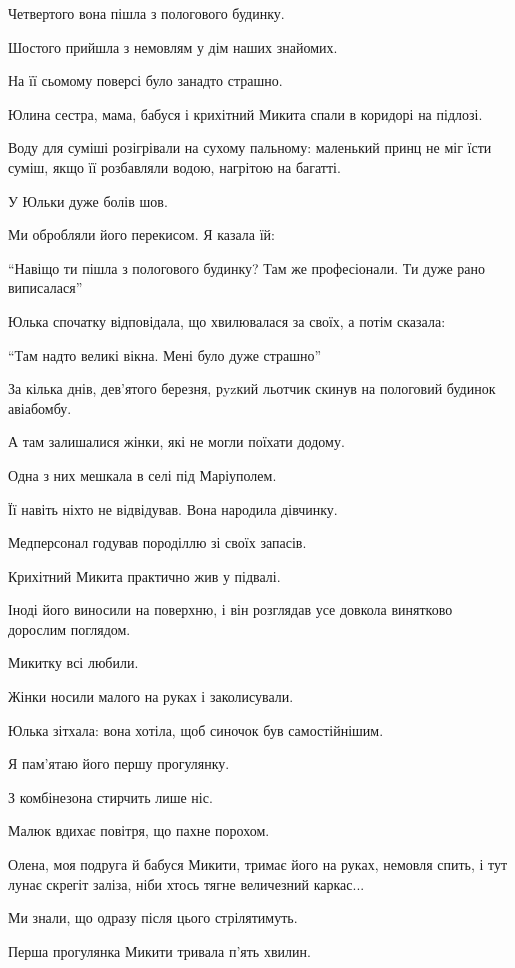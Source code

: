 Четвертого вона пішла з пологового будинку. \par
Шостого прийшла з немовлям у дім наших знайомих.\par
На її сьомому поверсі було занадто страшно.\par
Юлина сестра, мама, бабуся і крихітний Микита спали в коридорі на підлозі. \par
Воду для суміші розігрівали на сухому пальному: маленький принц не міг їсти суміш, якщо її розбавляли водою, нагрітою на багатті.\par
У Юльки дуже болів шов. \par
Ми обробляли його перекисом. Я казала їй: \par
\enquote{Навіщо ти пішла з пологового будинку? Там же професіонали. Ти дуже рано виписалася}\par
Юлька спочатку відповідала, що хвилювалася за своїх, а потім сказала:\par
\enquote{Там надто великі вікна. Мені було дуже страшно}\par
За кілька днів, дев'ятого березня, рyzкий льотчик скинув на пологовий будинок авіабомбу. \par
А там залишалися жінки, які не могли поїхати додому. \par
Одна з них мешкала в селі під Маріуполем. \par
Її навіть ніхто не відвідував. Вона народила дівчинку.\par
Медперсонал годував породіллю зі своїх запасів.\par
Крихітний Микита практично жив у підвалі. \par
Іноді його виносили на поверхню, і він розглядав усе довкола винятково дорослим поглядом.\par
Микитку всі  любили. \par
Жінки носили малого на руках і заколисували. \par
Юлька зітхала: вона хотіла, щоб синочок був самостійнішим.\par
Я пам'ятаю його першу прогулянку.\par
З комбінезона стирчить лише ніс.\par
Малюк  вдихає повітря, що пахне порохом. \par
Олена, моя подруга й бабуся Микити, тримає його на руках, немовля спить, і тут лунає скрегіт заліза, ніби хтось тягне величезний  каркас...\par
Ми знали, що одразу після цього стрілятимуть. \par
Перша прогулянка Микити тривала п'ять хвилин.\par
